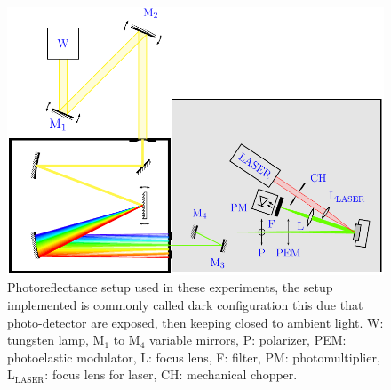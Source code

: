 \begin{figure}[b!]
	\centering
	\includegraphics[width=\textwidth]{../figures/chapter-3/pr-setup/build/pr-setup.pdf}
	\caption[PR Scheme]{Photoreflectance setup used in these experiments, the setup implemented is commonly called dark configuration this due that photo-detector are exposed, then keeping closed to ambient light.  W: tungsten lamp, $\mathrm{M_1}$ to $\mathrm{M_4}$ variable mirrors, P: polarizer, PEM: photoelastic modulator, L: focus lens, F: filter, PM: photomultiplier, $\mathrm{L_{LASER}}$: focus lens for laser, CH: mechanical chopper.}
	\label{fig:chapter-3-PR-SETUP}
\end{figure}

